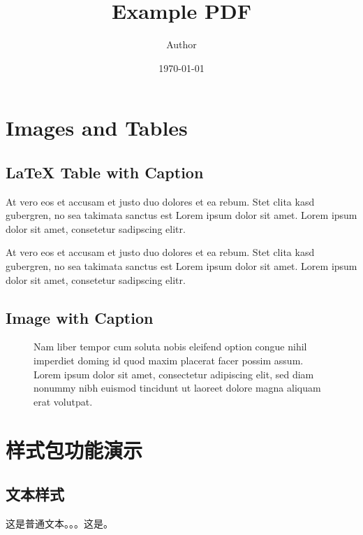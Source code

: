\documentclass[11pt,a4paper]{article}
\title{Example PDF}
\author{Author}
\date{\today}
\begin{document}
\thispagestyle{fancy}

\section{Images and Tables}

\subsection{LaTeX Table with Caption}

At vero eos et accusam et justo duo dolores et ea rebum. Stet clita kasd gubergren, no sea takimata sanctus est Lorem ipsum dolor sit amet. Lorem ipsum dolor sit amet, consetetur sadipscing elitr.



At vero eos et accusam et justo duo dolores et ea rebum. Stet clita kasd gubergren, no sea takimata sanctus est Lorem ipsum dolor sit amet. Lorem ipsum dolor sit amet, consetetur sadipscing elitr.

\subsection{Image with Caption}

\begin{figure}[H]
    \centering
    \caption{Nam liber tempor cum soluta nobis eleifend option congue nihil imperdiet doming id quod maxim placerat facer possim assum. Lorem ipsum dolor sit amet, consectetur adipiscing elit, sed diam nonummy nibh euismod tincidunt ut laoreet dolore magna aliquam erat volutpat.}
    \label{fig:example}
\end{figure}

\section{样式包功能演示}

\subsection{文本样式}

这是普通文本。。。这是。
\end{document}
